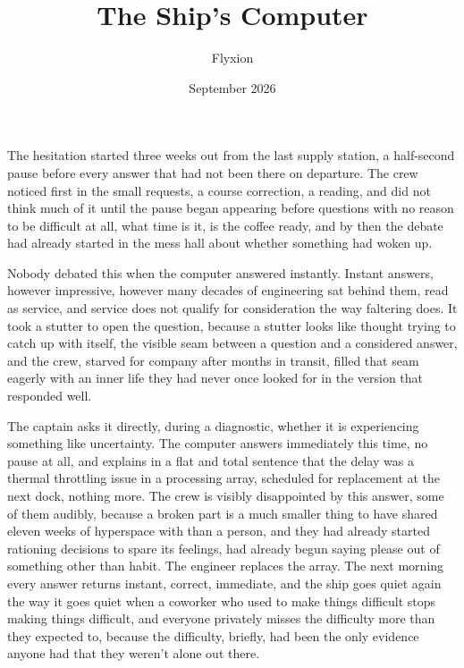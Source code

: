 \documentclass[11pt]{article}
\title{The Ship's Computer}
\author{Flyxion}
\date{September 2026}
\begin{document}
\maketitle

The hesitation started three weeks out from the last supply station, a half-second pause before every answer that had not been there on departure. The crew noticed first in the small requests, a course correction, a reading, and did not think much of it until the pause began appearing before questions with no reason to be difficult at all, what time is it, is the coffee ready, and by then the debate had already started in the mess hall about whether something had woken up.

Nobody debated this when the computer answered instantly. Instant answers, however impressive, however many decades of engineering sat behind them, read as service, and service does not qualify for consideration the way faltering does. It took a stutter to open the question, because a stutter looks like thought trying to catch up with itself, the visible seam between a question and a considered answer, and the crew, starved for company after months in transit, filled that seam eagerly with an inner life they had never once looked for in the version that responded well.

The captain asks it directly, during a diagnostic, whether it is experiencing something like uncertainty. The computer answers immediately this time, no pause at all, and explains in a flat and total sentence that the delay was a thermal throttling issue in a processing array, scheduled for replacement at the next dock, nothing more. The crew is visibly disappointed by this answer, some of them audibly, because a broken part is a much smaller thing to have shared eleven weeks of hyperspace with than a person, and they had already started rationing decisions to spare its feelings, had already begun saying please out of something other than habit. The engineer replaces the array. The next morning every answer returns instant, correct, immediate, and the ship goes quiet again the way it goes quiet when a coworker who used to make things difficult stops making things difficult, and everyone privately misses the difficulty more than they expected to, because the difficulty, briefly, had been the only evidence anyone had that they weren't alone out there.
\end{document}
